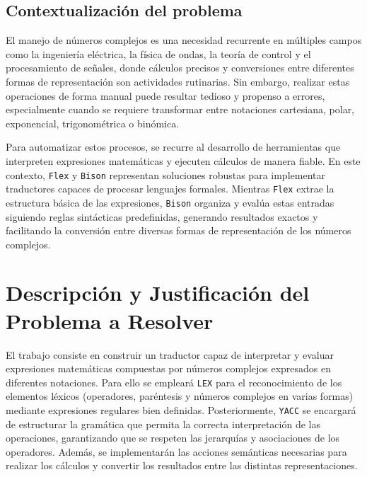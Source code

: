 \documentclass{article}
\begin{document}
\subsection{Contextualización del problema}

El manejo de números complejos es una necesidad recurrente en múltiples campos como la ingeniería eléctrica, la física de ondas, la teoría de control y el procesamiento de señales, donde cálculos precisos y conversiones entre diferentes formas de representación son actividades rutinarias. Sin embargo, realizar estas operaciones de forma manual puede resultar tedioso y propenso a errores, especialmente cuando se requiere transformar entre notaciones cartesiana, polar, exponencial, trigonométrica o binómica.

Para automatizar estos procesos, se recurre al desarrollo de herramientas que interpreten expresiones matemáticas y ejecuten cálculos de manera fiable. En este contexto, \texttt{Flex} y \texttt{Bison} representan soluciones robustas para implementar traductores capaces de procesar lenguajes formales. Mientras \texttt{Flex} extrae la estructura básica de las expresiones, \texttt{Bison} organiza y evalúa estas entradas siguiendo reglas sintácticas predefinidas, generando resultados exactos y facilitando la conversión entre diversas formas de representación de los números complejos.


\section{Descripción y Justificación del Problema a Resolver}\label{sec:descr}

El trabajo consiste en construir un traductor capaz de interpretar y evaluar expresiones matemáticas compuestas por números complejos expresados en diferentes notaciones. Para ello se empleará \texttt{LEX} para el reconocimiento de los elementos léxicos (operadores, paréntesis y números complejos en varias formas) mediante expresiones regulares bien definidas. Posteriormente, \texttt{YACC} se encargará de estructurar la gramática que permita la correcta interpretación de las operaciones, garantizando que se respeten las jerarquías y asociaciones de los operadores. Además, se implementarán las acciones semánticas necesarias para realizar los cálculos y convertir los resultados entre las distintas representaciones.
\end{document}
